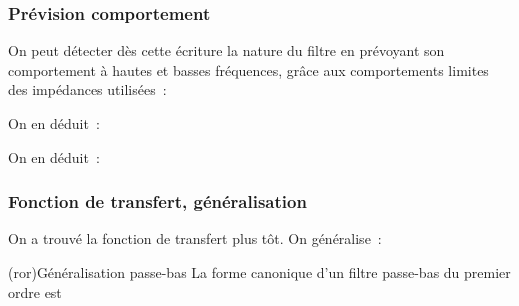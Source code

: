 \documentclass[../../main/main.tex]{subfiles}
\begin{document}
\subsubsection{Prévision comportement}
On peut détecter dès cette écriture la nature du filtre en prévoyant son
comportement à hautes et basses fréquences, grâce aux comportements limites des
impédances utilisées~:
\smallbreak
\begin{isd}
	\noindent
	\begin{minipage}[]{\linewidth}
		\centering
		\vspace{-15pt}
	\end{minipage}
	On en déduit~:
	\vspace{-15pt}
	\tcblower
	\begin{minipage}[]{\linewidth}
		\centering
		\vspace{-15pt}
	\end{minipage}
	On en déduit~:
	\vspace{-15pt}
\end{isd}

\subsubsection{Fonction de transfert, généralisation}
On a trouvé la fonction de transfert plus tôt. On généralise~:
\begin{tcb*}(ror){Généralisation passe-bas}
	La forme canonique d'un filtre passe-bas du premier ordre est
	\psw{
		\[
			\boxed{\Hu(x) = \frac{H_0}{1+\jx}}
			\qav
			x = \frac{\w}{\w_c}
			\qet
			H_0 = \cte
		\]
	}
\end{tcb*}
\end{document}
